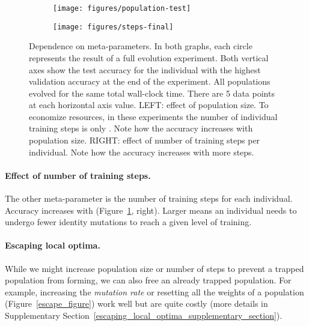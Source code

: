 \documentclass{article}
\begin{document}
\begin{figure}
    \vskip 0.2in
    \begin{centering}
        \begin{subfigure}[b]{0.49\columnwidth}
            \begin{centering}
                \centerline{\texttt{[image: figures/population-test]}}
            \end{centering}
        \end{subfigure}
        \begin{subfigure}[b]{0.49\columnwidth}
            \begin{centering}
                \centerline{\texttt{[image: figures/steps-final]}}
            \end{centering}
        \end{subfigure}
        \caption{Dependence on meta-parameters. In both graphs, each circle represents the result of a full evolution experiment. Both vertical axes show the test accuracy for the individual with the highest validation accuracy at the end of the experiment. All populations evolved for the same total wall-clock time. There are 5 data points at each horizontal axis value. LEFT: effect of population size. To economize resources, in these experiments the number of individual training steps is only . Note how the accuracy increases with population size. RIGHT: effect of number of training steps per individual. Note how the accuracy increases with more steps.}
        \label{meta_parameters_figure}
    \end{centering}
    \vskip 0.2in
\end{figure}

\vspace{-1em}
\paragraph{Effect of number of training steps.} The other meta-parameter is the number  of training steps for each individual. Accuracy increases with  (Figure~\ref{meta_parameters_figure}, right). Larger  means an individual needs to undergo fewer identity mutations to reach a given level of training.

\vspace{-1em}
\paragraph{Escaping local optima.} While we might increase population size or number of steps to prevent a trapped population from forming, we can also free an already trapped population. For example, increasing the {\em mutation rate} or resetting all the weights of a population (Figure~\ref{escape_figure}) work well but are quite costly (more details in Supplementary Section~\ref{escaping_local_optima_supplementary_section}).
\end{document}
